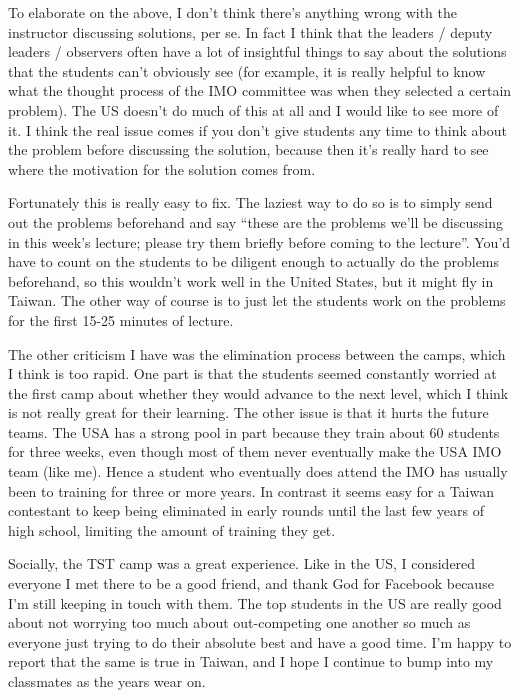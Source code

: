 \documentclass[11pt]{scrreprt}
\begin{document}
To elaborate on the above, I don't think there's anything wrong with the instructor discussing solutions, per se. In fact I think that the leaders / deputy leaders / observers often have a lot of insightful things to say about the solutions that the students can't obviously see (for example, it is really helpful to know what the thought process of the IMO committee was when they selected a certain problem). The US doesn't do much of this at all and I would like to see more of it. I think the real issue comes if you don't give students any time to think about the problem before discussing the solution, because then it's really hard to see where the motivation for the solution comes from.

Fortunately this is really easy to fix. The laziest way to do so is to simply send out the problems beforehand and say ``these are the problems we'll be discussing in this week's lecture; please try them briefly before coming to the lecture''. You'd have to count on the students to be diligent enough to actually do the problems beforehand, so this wouldn't work well in the United States, but it might fly in Taiwan. The other way of course is to just let the students work on the problems for the first 15-25 minutes of lecture.

The other criticism I have was the elimination process between the camps, which I think is too rapid. One part is that the students seemed constantly worried at the first camp about whether they would advance to the next level, which I think is not really great for their learning. The other issue is that it hurts the future teams. The USA has a strong pool in part because they train about 60 students for three weeks, even though most of them never eventually make the USA IMO team (like me). Hence a student who eventually does attend the IMO has usually been to training for three or more years. In contrast it seems easy for a Taiwan contestant to keep being eliminated in early rounds until the last few years of high school, limiting the amount of training they get.

Socially, the TST camp was a great experience. Like in the US, I considered everyone I met there to be a good friend, and thank God for Facebook because I'm still keeping in touch with them.
The top students in the US are really good about not worrying too much about out-competing one another so much as everyone just trying to do their absolute best and have a good time.
I'm happy to report that the same is true in Taiwan, and I hope I continue to bump into my classmates as the years wear on.
\end{document}
